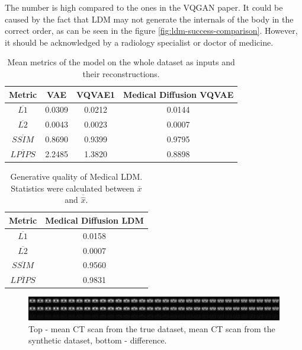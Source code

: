 The number is high compared to the ones in the VQGAN paper\cite{esser2021tamingtransformershighresolutionimage}. It could be caused by the fact that LDM may not generate the internals of the body in the correct order, as can be seen in the figure \ref{fig:ldm-success-comparison}. However, it should be acknowledged by a radiology specialist or doctor of medicine.
\begin{table}[h!]
\centering
\begin{tabular}{|c|c|c|c}
\hline
\textbf{Metric} & VAE & VQVAE1 & Medical Diffusion VQVAE & \\
\hline
$\overline{L1}$ & 0.0309 & 0.0212 & 0.0144 \\
\hline
$\overline{L2}$ & 0.0043 & 0.0023 & 0.0007 \\
\hline
$\overline{SSIM}$ & 0.8690 & 0.9399 & 0.9795 \\
\hline
$\overline{LPIPS}$ & 2.2485 & 1.3820 & 0.8898 \\
\hline
\end{tabular}
\caption{Mean metrics of the model on the whole dataset as inputs and their reconstructions.}
\label{table:metrics}
\end{table}

\begin{table}[h!]
\centering
\begin{tabular}{|c|c|}
\hline
\textbf{Metric} & Medical Diffusion LDM \\
\hline
$\overline{L1}$ & 0.0158 \\
\hline
$\overline{L2}$ & 0.0007 \\
\hline
$\overline{SSIM}$ & 0.9560 \\
\hline
$\overline{LPIPS}$ & 0.9831 \\
\hline
\end{tabular}
\caption{Generative quality of Medical LDM. Statistics were calculated between $\overline{x}$ and $\overline{\hat{x}}$.}
\label{table:metrics-ldm}
\end{table}


\begin{figure}[H]
    \centering
    \includegraphics[width=\linewidth]{reports/mean_true_vs_synthetic_comparison.png}
    \caption{Top - mean CT scan from the true dataset, mean CT scan from the synthetic dataset, bottom - difference.}
    \label{fig:mean_true_synth_diff}
\end{figure}


% 
